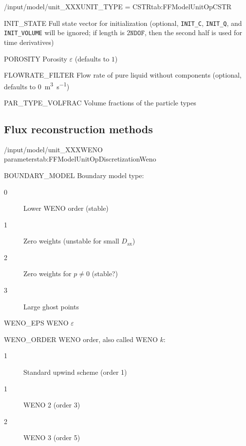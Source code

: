 \begin{condsubgroup}{/input/model/unit\_XXX}{UNIT\_TYPE = CSTR}{tab:FFModelUnitOpCSTR}
\begin{dataset}[unit=various,type=double,range={$\mathds{R}$},length={\texttt{NDOF} / $2\texttt{NDOF}$}]{INIT\_STATE}
    Full state vector for initialization (optional, \texttt{INIT\_C}, \texttt{INIT\_Q}, and \texttt{INIT\_VOLUME} will be ignored; if length is $2\texttt{NDOF}$, then the second half is used for time derivatives)
  \end{dataset}
  \begin{dataset}[unit=--,type=double,range={$[0,1]$},length={1}]{POROSITY}
    Porosity $\varepsilon$ (defaults to $1$)
  \end{dataset}
  \begin{dataset}[unit=\si{\cubic\metre\per\second},type=double,range={$\geq 0$},length={1 / \texttt{NSEC}}]{FLOWRATE\_FILTER}
    Flow rate of pure liquid without components (optional, defaults to \SI{0}{\cubic\metre\per\second})
  \end{dataset}
  \begin{dataset}[unit=--,type=double,range={$[0,1]$},length={\texttt{NPARTYPE}}]{PAR\_TYPE\_VOLFRAC}
    Volume fractions of the particle types
  \end{dataset}
\end{condsubgroup}

\subsection{Flux reconstruction methods}

\begin{subgroup}{/input/model/unit\_XXX}{WENO parameters}{tab:FFModelUnitOpDiscretizationWeno}
  \begin{dataset}[type=int,range={$\{ 0,1,2,3 \}$},length=1]{BOUNDARY\_MODEL}
    Boundary model type:
    \begin{description}
      \item[0] Lower WENO order (stable)
      \item[1] Zero weights (unstable for small $D_{\mathrm{ax}}$)
      \item[2] Zero weights for $p \neq 0$ (stable?)
      \item[3] Large ghost points
    \end{description}\vspace{-\baselineskip}
  \end{dataset}
  \begin{dataset}[type=double,range={$\geq 0$},length=1]{WENO\_EPS}
    WENO $\varepsilon$
  \end{dataset}
  \begin{dataset}[type=int,range={$\{ 1,2,3 \}$},length=1]{WENO\_ORDER}
    WENO order, also called WENO $k$:
    \begin{description}
      \item[1] Standard upwind scheme (order 1)
      \item[1] WENO 2 (order 3)
      \item[2] WENO 3 (order 5)
    \end{description}\vspace{-\baselineskip}
  \end{dataset}
\end{subgroup}

